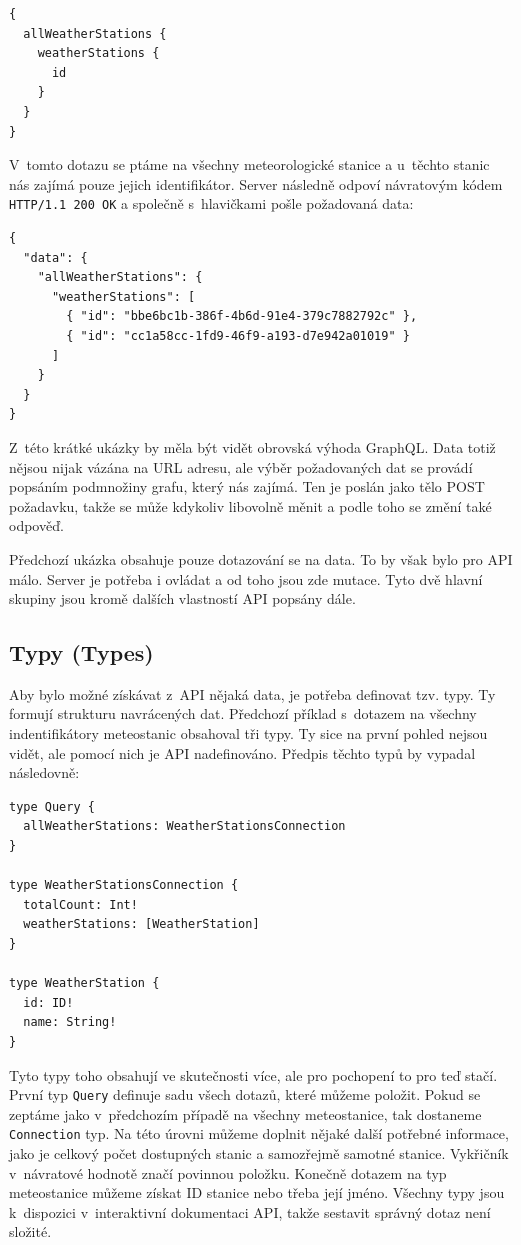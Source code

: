 \begin{verbatim}
{
  allWeatherStations {
    weatherStations {
      id
    }
  }
}
\end{verbatim}

V~tomto dotazu se ptáme na všechny meteorologické stanice a u~těchto stanic nás zajímá pouze jejich identifikátor. Server následně odpoví ná\-vra\-to\-vým kódem \texttt{HTTP/1.1 200 OK} a společně s~hlavičkami pošle požadovaná data:

\begin{verbatim}
{
  "data": {
    "allWeatherStations": {
      "weatherStations": [
        { "id": "bbe6bc1b-386f-4b6d-91e4-379c7882792c" },
        { "id": "cc1a58cc-1fd9-46f9-a193-d7e942a01019" }
      ]
    }
  }
}
\end{verbatim}

Z~této krátké ukázky by měla být vidět obrovská výhoda GraphQL. Data totiž nějsou nijak vázána na URL adresu, ale výběr požadovaných dat se provádí popsáním podmnožiny grafu, který nás zajímá. Ten je poslán jako tělo POST požadavku, takže se může kdykoliv libovolně měnit a podle toho se změní také odpověď.

Předchozí ukázka obsahuje pouze dotazování se na data. To by však bylo pro API málo. Server je potřeba i ovládat a od toho jsou zde mutace. Tyto dvě hlavní skupiny jsou kromě dalších vlastností API popsány dále.

\subsection{Typy (Types)}
Aby bylo možné získávat z~API nějaká data, je potřeba definovat tzv. typy. Ty formují strukturu navrácených dat. Předchozí příklad s~dotazem na všechny indentifikátory meteostanic obsahoval tři typy. Ty sice na první pohled nejsou vidět, ale pomocí nich je API nadefinováno. Předpis těchto typů by vypadal následovně:

\begin{verbatim}
type Query {
  allWeatherStations: WeatherStationsConnection
}

type WeatherStationsConnection {
  totalCount: Int!
  weatherStations: [WeatherStation]
}

type WeatherStation {
  id: ID!
  name: String!
}
\end{verbatim}

Tyto typy toho obsahují ve skutečnosti více, ale pro pochopení to pro teď stačí. První typ \texttt{Query} definuje sadu všech dotazů, které můžeme položit. Pokud se zeptáme jako v~předchozím případě na všechny meteostanice, tak dostaneme \texttt{Connection} typ. Na této úrovni můžeme doplnit nějaké další potřebné informace, jako je celkový počet dostupných stanic a samozřejmě samotné stanice. Vykřičník v~návratové hodnotě značí povinnou položku. Konečně dotazem na typ meteostanice můžeme získat ID stanice nebo třeba její jméno. Všechny typy jsou k~dispozici v~interaktivní dokumentaci API, takže sestavit správný dotaz není složité.

